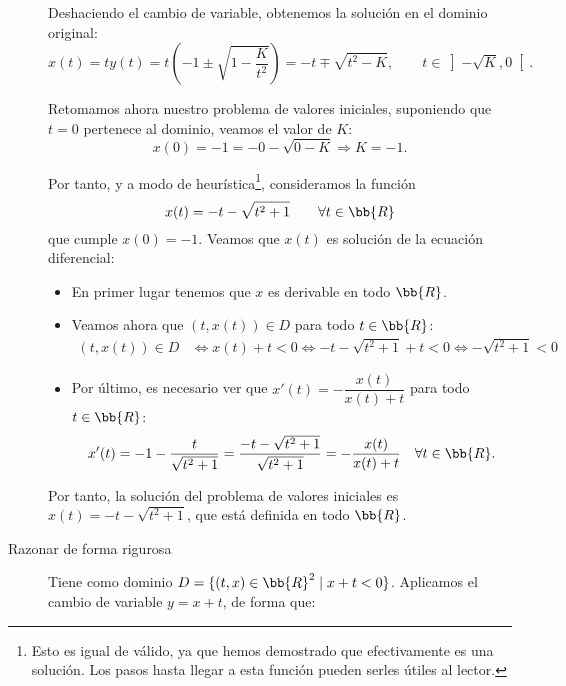 \documentclass[12pt]{article}
\begin{document}
\begin{ejercicio}
\begin{description}
        Deshaciendo el cambio de variable, obtenemos la solución en el dominio original:
        \begin{equation*}
            x(t)=ty(t)=t\left(-1\pm\sqrt{1-\dfrac{K}{t^2}}\right)=-t\mp\sqrt{t^2-K},\qquad t\in \left]-\sqrt{K},0\right[.
        \end{equation*}

        Retomamos ahora nuestro problema de valores iniciales, suponiendo que $t=0$ pertenece al dominio, veamos el valor de $K$:
        \begin{equation*}
            x(0)=-1=-0-\sqrt{0-K}\Longrightarrow K=-1.
        \end{equation*}
        

        Por tanto, y a modo de heurística\footnote{Esto es igual de válido, ya que hemos demostrado que efectivamente es una solución. Los pasos hasta llegar a esta función pueden serles útiles al lector.}, consideramos la función $$x(t)=-t-\sqrt{t^2+1}\qquad \forall t\in \bb{R}$$
        que cumple $x(0)=-1$. Veamos que $x(t)$ es solución de la ecuación diferencial:
        \begin{itemize}
            \item En primer lugar tenemos que $x$ es derivable en todo $\bb{R}$.
            \item Veamos ahora que $(t,x(t))\in D$ para todo $t\in\bb{R}$:
            \begin{align*}
                (t,x(t))\in D &\Longleftrightarrow x(t)+t<0
                \Longleftrightarrow -t-\sqrt{t^2+1}+t<0
                \Longleftrightarrow -\sqrt{t^2+1}<0
            \end{align*}
            \item Por último, es necesario ver que $x'(t)= -\dfrac{x(t)}{x(t)+t}$ para todo $t\in\bb{R}$:
            \begin{equation*}
                x'(t)=-1-\dfrac{t}{\sqrt{t^2+1}}=\dfrac{-t-\sqrt{t^2+1}}{\sqrt{t^2+1}}=-\dfrac{x(t)}{x(t)+t} \quad \forall t\in\bb{R}.
            \end{equation*}
        \end{itemize}
        Por tanto, la solución del problema de valores iniciales es $x(t)=-t-\sqrt{t^2+1}$, que está definida en todo $\bb{R}$.

        \item[Razonar de forma rigurosa]
        
        Tiene como dominio $D=\{(t,x)\in\bb{R}^2\mid x+t<0\}$. Aplicamos el cambio de variable $y=x+t$, de forma que:


\end{description}
\end{ejercicio}
\end{document}
